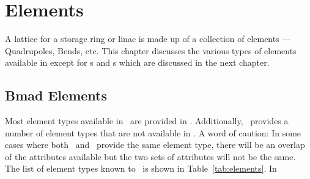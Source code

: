\chapter{Elements}

A lattice for a storage ring or linac is made up of a collection of
elements --- Quadrupoles, Bends, etc. This chapter discusses the
various types of elements available in \bmad except for s
and s which are discussed in the next chapter.

\section{Bmad Elements}

Most element types available in \mad\ are provided in \bmad.
Additionally, \bmad\ provides a number of element types that are not
available in \mad.  A word of caution: In some cases where both \mad\
and \bmad\ provide the same element type, there will be an overlap of 
the attributes available but the two sets of attributes will not be the same.
The list of element types known to \bmad\ is shown in Table~\ref{tab:elements}.
In
